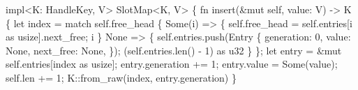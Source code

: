 \documentclass[
  11pt,
  letterpaper,
  DIV=11,
  numbers=noendperiod,
  twoside,
  open=right]{scrreprt}
\newenvironment{Shaded}{}{}
\newcommand{\ConstantTok}[1]{\textcolor[rgb]{0.00,0.36,0.77}{#1}}
\newcommand{\ControlFlowTok}[1]{\textcolor[rgb]{0.84,0.23,0.29}{#1}}
\newcommand{\DataTypeTok}[1]{\textcolor[rgb]{0.84,0.23,0.29}{#1}}
\newcommand{\DecValTok}[1]{\textcolor[rgb]{0.00,0.36,0.77}{#1}}
\newcommand{\KeywordTok}[1]{\textcolor[rgb]{0.84,0.23,0.29}{#1}}
\newcommand{\NormalTok}[1]{\textcolor[rgb]{0.14,0.16,0.18}{#1}}
\newcommand{\OperatorTok}[1]{\textcolor[rgb]{0.14,0.16,0.18}{#1}}
\newcommand{\PreprocessorTok}[1]{\textcolor[rgb]{0.84,0.23,0.29}{#1}}
\renewenvironment{Shaded}{\begin{snugshade}\small\setstretch{0.95}}{\end{snugshade}}
\begin{document}
\begin{codelisting}
{\begin{Shaded}
\begin{Highlighting}[]
\KeywordTok{impl}\OperatorTok{\textless{}}\NormalTok{K}\OperatorTok{:}\NormalTok{ HandleKey}\OperatorTok{,}\NormalTok{ V}\OperatorTok{\textgreater{}}\NormalTok{ SlotMap}\OperatorTok{\textless{}}\NormalTok{K}\OperatorTok{,}\NormalTok{ V}\OperatorTok{\textgreater{}} \OperatorTok{\{}
    \KeywordTok{fn}\NormalTok{ insert(}\OperatorTok{\&}\KeywordTok{mut} \KeywordTok{self}\OperatorTok{,}\NormalTok{ value}\OperatorTok{:}\NormalTok{ V) }\OperatorTok{{-}\textgreater{}}\NormalTok{ K }\OperatorTok{\{}
        \KeywordTok{let}\NormalTok{ index }\OperatorTok{=} \ControlFlowTok{match} \KeywordTok{self}\OperatorTok{.}\NormalTok{free\_head }\OperatorTok{\{}
            \ConstantTok{Some}\NormalTok{(i) }\OperatorTok{=\textgreater{}} \OperatorTok{\{}
                \KeywordTok{self}\OperatorTok{.}\NormalTok{free\_head }\OperatorTok{=} \KeywordTok{self}\OperatorTok{.}\NormalTok{entries[i }\KeywordTok{as} \DataTypeTok{usize}\NormalTok{]}\OperatorTok{.}\NormalTok{next\_free}\OperatorTok{;}
\NormalTok{                i}
            \OperatorTok{\}}
            \ConstantTok{None} \OperatorTok{=\textgreater{}} \OperatorTok{\{}
                \KeywordTok{self}\OperatorTok{.}\NormalTok{entries}\OperatorTok{.}\NormalTok{push(Entry }\OperatorTok{\{}
\NormalTok{                    generation}\OperatorTok{:} \DecValTok{0}\OperatorTok{,}
\NormalTok{                    value}\OperatorTok{:} \ConstantTok{None}\OperatorTok{,}
\NormalTok{                    next\_free}\OperatorTok{:} \ConstantTok{None}\OperatorTok{,}
                \OperatorTok{\}}\NormalTok{)}\OperatorTok{;}
\NormalTok{                (}\KeywordTok{self}\OperatorTok{.}\NormalTok{entries}\OperatorTok{.}\NormalTok{len() }\OperatorTok{{-}} \DecValTok{1}\NormalTok{) }\KeywordTok{as} \DataTypeTok{u32}
            \OperatorTok{\}}
        \OperatorTok{\};}
        \KeywordTok{let}\NormalTok{ entry }\OperatorTok{=} \OperatorTok{\&}\KeywordTok{mut} \KeywordTok{self}\OperatorTok{.}\NormalTok{entries[index }\KeywordTok{as} \DataTypeTok{usize}\NormalTok{]}\OperatorTok{;}
\NormalTok{        entry}\OperatorTok{.}\NormalTok{generation }\OperatorTok{+=} \DecValTok{1}\OperatorTok{;}
\NormalTok{        entry}\OperatorTok{.}\NormalTok{value }\OperatorTok{=} \ConstantTok{Some}\NormalTok{(value)}\OperatorTok{;}
        \KeywordTok{self}\OperatorTok{.}\NormalTok{len }\OperatorTok{+=} \DecValTok{1}\OperatorTok{;}
        \PreprocessorTok{K::}\NormalTok{from\_raw(index}\OperatorTok{,}\NormalTok{ entry}\OperatorTok{.}\NormalTok{generation)}
    \OperatorTok{\}}


\end{Highlighting}
\end{Shaded}}
\end{codelisting}
\end{document}
